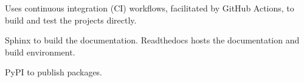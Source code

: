 Uses continuous integration (CI) workflows, facilitated by GitHub Actions, to build and test the projects directly.

Sphinx to build the documentation. Readthedocs hosts the documentation and build environment. 

PyPI to publish packages. 

